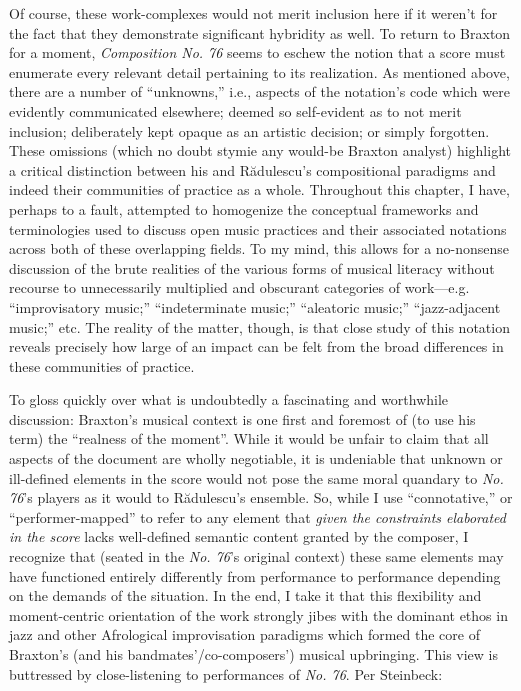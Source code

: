         Of course, these work-complexes would not merit inclusion here if it weren't for the fact that they demonstrate significant hybridity as well. To return to Braxton for a moment, \textit{Composition No. 76} seems to eschew the notion that a score must enumerate every relevant detail pertaining to its realization. As mentioned above, there are a number of ``unknowns,'' i.e., aspects of the notation's code which were evidently communicated elsewhere; deemed so self-evident as to not merit inclusion; deliberately kept opaque as an artistic decision; or simply forgotten. These omissions (which no doubt stymie any would-be Braxton analyst) highlight a critical distinction between his and R\u{a}dulescu's compositional paradigms and indeed their communities of practice as a whole. Throughout this chapter, I have, perhaps to a fault, attempted to homogenize the conceptual frameworks and terminologies used to discuss open music practices and their associated notations across both of these overlapping fields. To my mind, this allows for a no-nonsense discussion of the brute realities of the various forms of musical literacy without recourse to unnecessarily multiplied and obscurant categories of work---e.g. ``improvisatory music;'' ``indeterminate music;'' ``aleatoric music;'' ``jazz-adjacent music;'' etc. The reality of the matter, though, is that close study of this notation reveals precisely how large of an impact can be felt from the broad differences in these communities of practice.

        To gloss quickly over what is undoubtedly a fascinating and worthwhile discussion: Braxton's musical context is one first and foremost of (to use his term) the ``realness of the moment''.\autocite[149]{Braxton_1988} While it would be unfair to claim that all aspects of the document are wholly negotiable, it is undeniable that unknown or ill-defined elements in the score would not pose the same moral quandary to \textit{No. 76}'s players as it would to R\u{a}dulescu's ensemble. So, while I use ``connotative,'' or ``performer-mapped'' to refer to any element that \textit{given the constraints elaborated in the score} lacks well-defined semantic content granted by the composer, I recognize that (seated in the \textit{No. 76}'s original context) these same elements may have functioned entirely differently from performance to performance depending on the demands of the situation. In the end, I take it that this flexibility and moment-centric orientation of the work strongly jibes with the dominant ethos in jazz and other Afrological improvisation paradigms which formed the core of Braxton's (and his bandmates'/co-composers') musical upbringing. This view is buttressed by close-listening to performances of \textit{No. 76}. Per Steinbeck:

